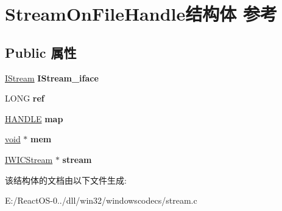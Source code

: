 \hypertarget{struct_stream_on_file_handle}{}\section{Stream\+On\+File\+Handle结构体 参考}
\label{struct_stream_on_file_handle}
\subsection*{Public 属性}
\begin{DoxyCompactItemize}
\item 
\mbox{\label{struct_stream_on_file_handle_aa87b8f742ec54829bb29fe48c89e9597}} 
\hyperlink{interface_i_stream}{I\+Stream} {\bfseries I\+Stream\+\_\+iface}
\item 
\mbox{\label{struct_stream_on_file_handle_aa703638e115800da589bce0fed99fcd1}} 
L\+O\+NG {\bfseries ref}
\item 
\mbox{\label{struct_stream_on_file_handle_a6c21e2e89f254d615a16fb3524929122}} 
\hyperlink{interfacevoid}{H\+A\+N\+D\+LE} {\bfseries map}
\item 
\mbox{\label{struct_stream_on_file_handle_a3c8b9983c451afd30e5a54806fea1ef4}} 
\hyperlink{interfacevoid}{void} $\ast$ {\bfseries mem}
\item 
\mbox{\label{struct_stream_on_file_handle_a018c3e52e1a9d44ad141f3610474a50d}} 
\hyperlink{interface_i_w_i_c_stream}{I\+W\+I\+C\+Stream} $\ast$ {\bfseries stream}
\end{DoxyCompactItemize}


该结构体的文档由以下文件生成\+:\begin{DoxyCompactItemize}
\item 
E\+:/\+React\+O\+S-\/0../dll/win32/windowscodecs/stream.\+c\end{DoxyCompactItemize}
